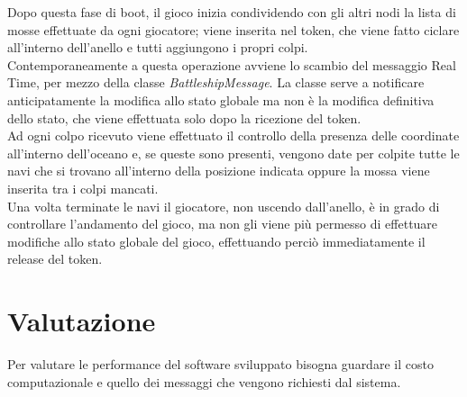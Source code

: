 \documentclass{llncs}
\begin{document}
Dopo questa fase di boot, il gioco inizia condividendo con gli altri nodi la lista di mosse effettuate da ogni giocatore; viene inserita nel token, che viene fatto ciclare all'interno dell'anello e tutti aggiungono i propri colpi.\\ 
Contemporaneamente a questa operazione avviene lo scambio del messaggio Real Time, per mezzo della classe \emph{BattleshipMessage}. La classe serve a notificare anticipatamente la modifica allo stato globale ma non è la modifica definitiva dello stato, che viene effettuata solo dopo la ricezione del token.\\
Ad ogni colpo ricevuto viene effettuato il controllo della presenza delle coordinate all'interno dell'oceano e, se queste sono presenti, vengono date per colpite tutte le navi che si trovano all'interno della posizione indicata oppure la mossa viene inserita tra i colpi mancati.\\
Una volta terminate le navi il giocatore, non uscendo dall'anello, è in grado di controllare l'andamento del gioco, ma non gli viene più permesso di effettuare modifiche allo stato globale del gioco, effettuando perciò immediatamente il release del token.\\

\section{Valutazione}
Per valutare le performance del software sviluppato bisogna guardare il costo computazionale e quello dei messaggi che vengono richiesti dal sistema.\\
\end{document}

